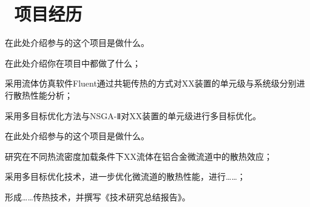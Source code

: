 \documentclass[a4paper,11pt]{ctexart}
\begin{document}

\vspace{-4.5mm}

\section{\texorpdfstring{\faCogs\,}{} 项目经历}

\resumeSubHeadingListStart

  {在此处介绍参与的这个项目是做什么。}
  \resumeItemListStart
    \item 在此处介绍你在项目中都做了什么；
    \item 采用流体仿真软件Fluent通过共轭传热的方式对XX装置的单元级与系统级分别进行散热性能分析；
    \item 采用多目标优化方法与NSGA-Ⅱ对XX装置的单元级进行多目标优化。
  \resumeItemListEnd


  {在此处介绍参与的这个项目是做什么。}
  \resumeItemListStart
    \item 研究在不同热流密度加载条件下XX流体在铝合金微流道中的散热效应；
    \item 采用多目标优化技术，进一步优化微流道的散热性能，进行……；
    \item 形成……传热技术，并撰写《技术研究总结报告》。
  \resumeItemListEnd
\end{document}
